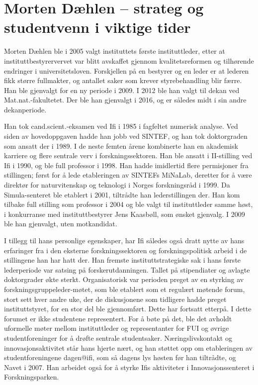 \chapter[Morten Dæhlen]{Morten Dæhlen – strateg og studentvenn i viktige tider}

\author{Skrevet av Narve Trædal}

Morten Dæhlen ble i 2005 valgt instituttets første instituttleder, etter at instituttbestyrervervet var blitt avskaffet gjennom kvalitetsreformen og tilhørende endringer i universitetsloven. Forskjellen på en bestyrer og en leder er at lederen fikk større fullmakter, og antallet saker som krever styrebehandling blir færre. Han ble gjenvalgt for en ny periode i 2009. I 2012 ble han valgt til dekan ved Mat.nat.-fakultetet. Der ble han gjenvalgt i 2016, og er således midt i sin andre dekanperiode.

Han tok cand.scient.-eksamen ved Ifi i 1985 i fagfeltet numerisk analyse. Ved siden av hovedoppgaven hadde han jobb ved SINTEF, og han tok doktorgraden som ansatt der i 1989. I de neste femten årene kombinerte han en akademisk karriere og flere sentrale verv i forskningssektoren. Han ble ansatt i II-stilling ved Ifi i 1990, og ble full professor i 1998. Han hadde imidlertid flere permisjoner fra stillingen; først for å lede etableringen av SINTEFs MiNaLab, deretter for å være direktør for naturvitenskap og teknologi i Norges forskningsråd i 1999. Da Simula-senteret ble etablert i 2001, tiltrådte han lederstillingen der. Han kom tilbake full stilling som professor i 2004 og ble valgt til instituttleder samme høst, i konkurranse med instituttbestyrer Jens Kaasbøll, som ønsket gjenvalg. I 2009 ble han gjenvalgt, uten motkandidat.

I tillegg til hans personlige egenskaper, har Ifi således også dratt nytte av hans erfaringer fra i den eksterne forskningssektoren og forskningspolitisk arbeid i de stillingene han har hatt der. Han fremste instituttstrategiske sak i hans første lederperiode var satsing på forskerutdanningen. Tallet på stipendiater og avlagte doktorgrader økte sterkt. Organisatorisk var perioden preget av en styrking av forskningsgruppeleder-møtet, som ble etablert som et regulært møtende forum, stort sett hver andre uke, der de diskusjonene som tidligere hadde preget instituttstyret, for en stor del ble gjennomført. Dette har fortsatt etterpå. I dette forumet er ikke studentene representert. For å bøte på det, ble det avholdt uformelle møter mellom instituttleder og representanter for FUI og øvrige studentforeninger for å drøfte sentrale studentsaker. Næringslivskontakt og innovasjonsaktivitet står hans hjerte nært, og han støttet opp om etableringen av studentforeningene dagen@ifi, som så dagens lys høsten før han tiltrådte, og Navet i 2007. Han arbeidet også for å styrke Ifis aktiviteter i Innovasjonssenteret i Forskningsparken.

